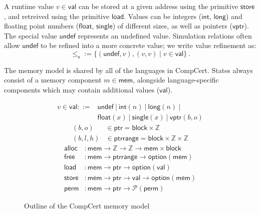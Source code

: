 \documentclass[acmsmall,authordraft]{acmart}
\newcommand{\kw}[1]{\ensuremath{ \mathsf{#1} }}
\newcommand{\alt}{\ |\ } %
\newcommand{\vref}{\le_\kw{v}}
\begin{document}
A runtime value $v \in \kw{val}$ can be stored at
a given address using the primitive \kw{store},
and retreived using the primitive \kw{load}.
Values can be integers (\kw{int}, \kw{long}) and
floating point numbers (\kw{float}, \kw{single})
of different sizes,
as well as pointers (\kw{vptr}).
The special value \kw{undef}
represents an undefined value.
Simulation relations
often allow $\kw{undef}$
to be refined into a more concrete value;
we write value refinement as:
\[
    {\vref} := \{(\kw{undef}, v), (v, v) \mid v \in \kw{val}\} \,.
\]

The memory model is shared by all of the languages in CompCert.
States always consist of
a memory component $m \in \kw{mem}$,
alongside language-specific components
which may contain additional values ($\kw{val}$).


\begin{figure} %
  \begin{align*}
    v \in \kw{val} ::= {} &
          \kw{undef} \alt
          \kw{int}(n) \alt
          \kw{long}(n) \alt \\ &
          \kw{float}(x) \alt
          \kw{single}(x) \alt
          \kw{vptr}(b, o)
  \end{align*}
  \begin{align*}
    (b, o) &\in \kw{ptr} =
      \kw{block} \times \mathbb{Z}
    \\
    (b, l, h) &\in \kw{ptrrange} =
      \kw{block} \times \mathbb{Z} \times \mathbb{Z}
  \end{align*}
  \begin{align*}
    \kw{alloc} &:
      \kw{mem} \rightarrow \mathbb{Z} \rightarrow \mathbb{Z} \rightarrow
      \kw{mem} \times \kw{block}
    \\
    \kw{free} &:
      \kw{mem} \rightarrow
      \kw{ptrrange} \rightarrow
      \kw{option}(\kw{mem})
    \\
    \kw{load} &:
      \kw{mem} \rightarrow \kw{ptr} \rightarrow \kw{option}(\kw{val})
    \\
    \kw{store} &:
      \kw{mem} \rightarrow \kw{ptr} \rightarrow \kw{val} \rightarrow \kw{option}(\kw{mem})
    \\
    \kw{perm} &:
      \kw{mem} \rightarrow \kw{ptr} \rightarrow \mathcal{P}(\kw{perm})
  \end{align*}
  \caption{Outline of the CompCert memory model}
  \label{fig:mm}
\end{figure}
\end{document}

